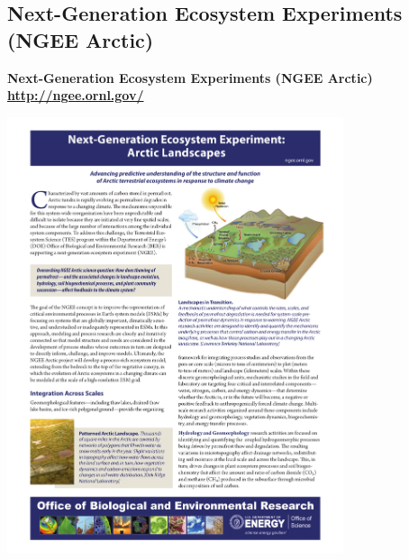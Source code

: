 \subsection[NGEE Arctic]{Next-Generation Ecosystem Experiments (NGEE Arctic)}
\begin{frame}
 \begin{center}
  \vskip-0.15in
  \begin{block}{}\centering
   \textbf{\color{CCSIGreen}Next-Generation Ecosystem Experiments (NGEE Arctic) \\
   \url{http://ngee.ornl.gov/}}
  \end{block}
  \includegraphics[width=0.74\textwidth,page=1,trim=4.25in 6.38in 0.5in 1.75in,clip=TRUE]{ngee_figures/TES-ArcticEco_07-25-2012d.pdf} \\
  \tiny\textit{}
 \end{center}
 \vskip-0.25in
 \begin{block}{}

\end{block}
\end{frame}
